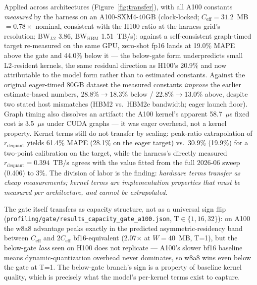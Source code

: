 \documentclass[10pt,twocolumn]{article}
\begin{document}
Applied across architectures (Figure~\ref{fig:transfer}), with all A100 constants \emph{measured} by the harness on an A100-SXM4-40GB (clock-locked; $C_\text{eff}=31.2$~MB $=0.78\times$ nominal, consistent with the H100 ratio at the harness grid's resolution; $\mathrm{BW}_{L2}$ 3.86, $\mathrm{BW}_\text{HBM}$ 1.51~TB/s): against a self-consistent graph-timed target re-measured on the same GPU, zero-shot fp16 lands at 19.0\% MAPE above the gate and 44.0\% below it --- the below-gate form underpredicts small L2-resident kernels, the same residual direction as H100's 20.9\% and now attributable to the model form rather than to estimated constants.  Against the original eager-timed 80GB dataset the measured constants \emph{improve} the earlier estimate-based numbers, 28.8\%$\to$18.3\% below / 22.8\%$\to$13.0\% above, despite two stated host mismatches (HBM2 vs.\ HBM2e bandwidth; eager launch floor).  Graph timing also dissolves an artifact: the A100 kernel's apparent 58.7~$\mu$s fixed cost is 3.5~$\mu$s under CUDA graphs --- it was eager overhead, not a kernel property.  Kernel terms still do not transfer by scaling: peak-ratio extrapolation of $r_\text{dequant}$ yields 61.4\% MAPE (28.1\% on the eager target) vs.\ 30.9\% (19.9\%) for a two-point calibration on the target, while the harness's directly measured $r_\text{dequant}=0.394$~TB/s agrees with the value fitted from the full 2026-06 sweep (0.406) to 3\%.  The division of labor is the finding: \emph{hardware terms transfer as cheap measurements; kernel terms are implementation properties that must be measured per architecture, and cannot be extrapolated}.

The gate itself transfers as capacity structure, not as a universal sign flip (\texttt{profiling/gate/results\_capacity\_gate\_a100.json}, T$\in\{1,16,32\}$): on A100 the w8a8 advantage peaks exactly in the predicted asymmetric-residency band between $C_\text{eff}$ and $2C_\text{eff}$ bf16-equivalent (2.07$\times$ at $W{=}40$~MB, T=1), but the below-gate \emph{loss} seen on H100 does not replicate --- A100's slower bf16 baseline means dynamic-quantization overhead never dominates, so w8a8 wins even below the gate at T=1.  The below-gate branch's sign is a property of baseline kernel quality, which is precisely what the model's per-kernel terms exist to capture.
\end{document}
